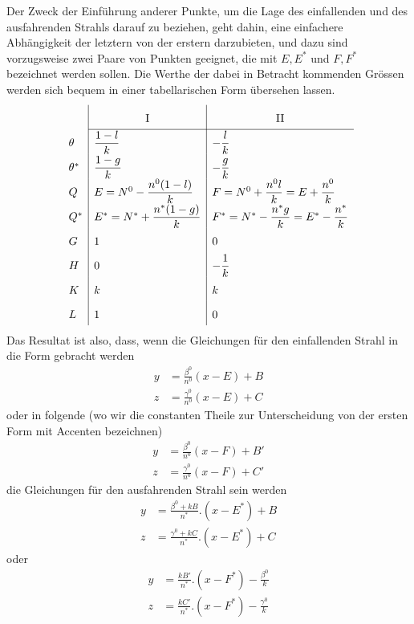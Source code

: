 Der Zweck der Einführung anderer Punkte, um die Lage des einfallenden und des ausfahrenden Strahls darauf zu beziehen, geht dahin, eine einfachere Abhängigkeit der letztern von der erstern darzubieten, und dazu sind vorzugsweise zwei Paare von Punkten geeignet, die mit $E,E^*$ und $F,F^*$ bezeichnet werden sollen. Die Werthe der dabei in Betracht kommenden Grössen werden sich bequem in einer tabellarischen Form übersehen lassen.
\[
\renewcommand{\arraystretch}{1.8}
\begin{array}{l|l|l}
&\multicolumn{1}{c|}{\mathrm{I}}&\multicolumn{1}{c}{\mathrm{II}}\\\cline{2-3}
\theta&\dfrac{1-l}{k}&-\dfrac{l}{k}\\
\theta^*&\dfrac{1-g}{k}&-\dfrac{g}{k}\\
Q&E=N^0-\dfrac{n^0(1-l)}{k}&F=N^0+\dfrac{n^0l}{k}=E+\dfrac{n^0}{k}\\
Q^*&E^*=N^*+\dfrac{n^*(1-g)}{k}&F^*=N^*-\dfrac{n^*g}{k}=E^*-\dfrac{n^*}{k}\\
G&1&0\\
H&0&-\dfrac1k\\
K&k&k\\
L&1&0
\end{array}
\]
Das Resultat ist also, dass, wenn die Gleichungen für den einfallenden Strahl in die Form gebracht werden
\[
\begin{aligned}
y&=\frac{\beta^0}{n^0}(x-E)+B\\
z&=\frac{\gamma^0}{n^0}(x-E)+C
\end{aligned}
\]
oder in folgende (wo wir die constanten Theile zur Unterscheidung von der ersten Form mit Accenten bezeichnen)
\[
\begin{aligned}
y&=\frac{\beta^0}{n^0}(x-F)+B'\\
z&=\frac{\gamma^0}{n^0}(x-F)+C'
\end{aligned}
\]
die Gleichungen für den ausfahrenden Strahl sein werden
\[
\begin{aligned}
y&=\frac{\beta^0+kB}{n^*}.(x-E^*)+B\\
z&=\frac{\gamma^0+kC}{n^*}.(x-E^*)+C
\end{aligned}
\]
oder
\[
\begin{aligned}
y&=\frac{kB'}{n^*}.(x-F^*)-\frac{\beta^0}k\\
z&=\frac{kC'}{n^*}.(x-F^*)-\frac{\gamma^0}k
\end{aligned}
\]
